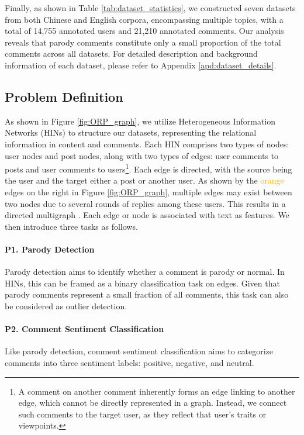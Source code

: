 Finally, as shown in Table \ref{tab:dataset_statistics}, we constructed seven datasets from both Chinese and English corpora, encompassing multiple topics, with a total of 14,755 annotated users and 21,210 annotated comments. Our analysis reveals that parody comments constitute only a small proportion of the total comments across all datasets. For detailed description and background information of each dataset, please refer to Appendix \ref{apd:dataset_details}.



\subsection{Problem Definition}\label{sec:problem_definition}

As shown in Figure \ref{fig:ORP_graph}, we utilize Heterogeneous Information Networks (HINs) to structure our datasets, representing the relational information in content and comments. Each HIN comprises two types of nodes: user nodes and post nodes, along with two types of edges: user comments to posts and user comments to users\footnote{A comment on another comment inherently forms an edge linking to another edge, which cannot be directly represented in a graph. Instead, we connect such comments to the target user, as they reflect that user's traits or viewpoints.}. Each edge is directed, with the source being the user and the target either a post or another user. As shown by the \textcolor{orange}{orange} edges on the right in Figure \ref{fig:ORP_graph}, multiple edges may exist between two nodes due to several rounds of replies among these users. This results in a directed multigraph \citep{gross2003handbook}. Each edge or node is associated with text as features. We then introduce three tasks as follows.

\paragraph{P1. Parody Detection} Parody detection aims to identify whether a comment is \textcolor{orp}{parody} or \textcolor{neu}{normal}. In HINs, this can be framed as a binary classification task on edges. Given that parody comments represent a small fraction of all comments, this task can also be considered as outlier detection.

\paragraph{P2. Comment Sentiment Classification} Like parody detection, comment sentiment classification aims to categorize comments into three sentiment labels: \textcolor{pos}{positive}, \textcolor{neg}{negative}, and \textcolor{neu}{neutral}.


